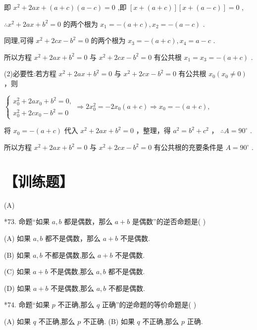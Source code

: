 \documentclass[10pt]{article}
\begin{document}
即 \({x}^{2} + {2ax} + \left( {a + c}\right) \left( {a - c}\right)  = 0\) ,即 \(\left\lbrack  {x + \left( {a + c}\right) }\right\rbrack  \left\lbrack  {x + \left( {a - c}\right) }\right\rbrack   = 0\) ,

\(\therefore {x}^{2} + {2ax} + {b}^{2} = 0\) 的两个根为 \({x}_{1} =  - \left( {a + c}\right) ,{x}_{2} =  - \left( {a - c}\right)\) .

同理,可得 \({x}^{2} + {2cx} - {b}^{2} = 0\) 的两个根为 \({x}_{3} =  - \left( {a + c}\right) ,{x}_{4} = a - c\) .

所以方程 \({x}^{2} + {2ax} + {b}^{2} = 0\) 与 \({x}^{2} + {2cx} - {b}^{2} = 0\) 有公共根 \({x}_{1} = {x}_{3} =  - \left( {a + c}\right)\) .

(2)必要性:若方程 \({x}^{2} + {2ax} + {b}^{2} = 0\) 与 \({x}^{2} + {2cx} - {b}^{2} = 0\) 有公共根 \({x}_{0}\left( {{x}_{0} \neq  0}\right)\) ，则

\(\left\{  {\begin{array}{l} {x}_{0}^{2} + {2a}{x}_{0} + {b}^{2} = 0, \\  {x}_{0}^{2} + {2c}{x}_{0} - {b}^{2} = 0 \end{array} \Rightarrow  2{x}_{0}^{2} =  - 2{x}_{0}\left( {a + c}\right)  \Rightarrow  {x}_{0} =  - \left( {a + c}\right) ,}\right.\)

将 \({x}_{0} =  - \left( {a + c}\right)\) 代入 \({x}^{2} + {2ax} + {b}^{2} = 0\) ，整理，得 \({a}^{2} = {b}^{2} + {c}^{2}\) ， \(\therefore A = {90}^{ \circ  }\) .

所以方程 \({x}^{2} + {2ax} + {b}^{2} = 0\) 与 \({x}^{2} + {2cx} - {b}^{2} = 0\) 有公共根的充要条件是 \(A = {90}^{ \circ  }\) .

\section*{【训练题】}

(A)

*73. 命题“如果 \(a,b\) 都是偶数，那么 \(a + b\) 是偶数”的逆否命题是( )

(A) 如果 \(a,b\) 都不是偶数，那么 \(a + b\) 不是偶数.

(B) 如果 \(a,b\) 不都是偶数,那么 \(a + b\) 不是偶数.

(C) 如果 \(a + b\) 不是偶数,那么 \(a,b\) 都不是偶数.

(D) 如果 \(a + b\) 不是偶数,那么 \(a,b\) 不都是偶数.

*74. 命题“如果 \(p\) 不正确,那么 \(q\) 正确”的逆命题的等价命题是( )

(A) 如果 \(q\) 不正确,那么 \(p\) 不正确. (B) 如果 \(q\) 不正确,那么 \(p\) 正确.
\end{document}
